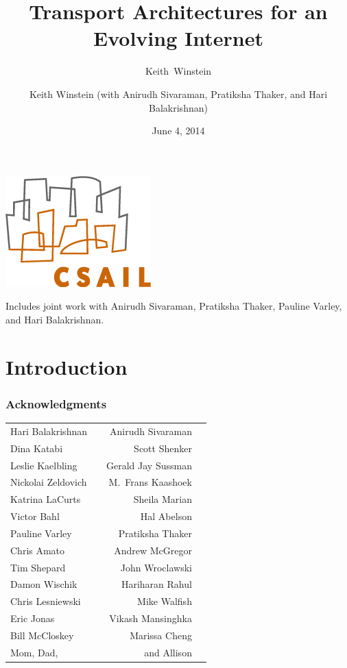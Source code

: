 \documentclass[svgnames]{beamer}
\title{Transport Architectures for an Evolving Internet}
\author{Keith~Winstein}
\institute{MIT Computer Science and Artificial Intelligence Laboratory\\\vspace{\baselineskip}\textcolor{DarkBlue}{}}
\date{June 4, 2014}
\begin{document}
\begin{frame}[plain]

\titlepage

\begin{centering}

\includegraphics[width=2 cm]{csaillogomed.png}

\vspace{\baselineskip}
\vspace{\baselineskip}

\tiny Includes joint work with Anirudh Sivaraman, Pratiksha Thaker, Pauline Varley, and Hari Balakrishnan.

\end{centering}

\end{frame}

\author{Keith Winstein (with Anirudh Sivaraman, Pratiksha Thaker, and Hari Balakrishnan)}

\institute{}

\section{Introduction}

\begin{frame}
\frametitle{Acknowledgments}

\begin{tabular}{lp{3 cm}rl}
Hari Balakrishnan & & Anirudh Sivaraman \\
Dina Katabi & & Scott Shenker \\
Leslie Kaelbling & & Gerald Jay Sussman \\
Nickolai Zeldovich & & M.~Frans Kaashoek \\
Katrina LaCurts & & Sheila Marian \\
Victor Bahl & & Hal Abelson \\
Pauline Varley & & Pratiksha Thaker \\
Chris Amato & & Andrew McGregor \\
Tim Shepard & & John Wroclawski \\
Damon Wischik & & Hariharan Rahul \\
Chris Lesniewski & & Mike Walfish \\ 
Eric Jonas & & Vikash Mansinghka \\
Bill McCloskey & & Marissa Cheng \\
Mom, Dad, & & and Allison \\
\end{tabular}
\end{frame}
\end{document}
